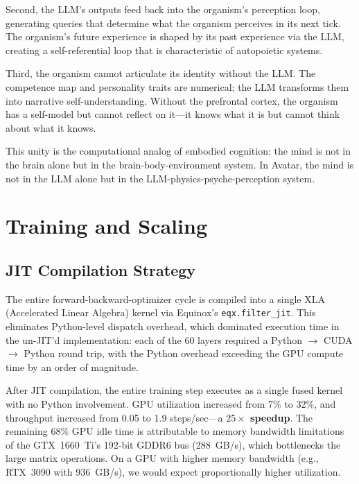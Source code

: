 \documentclass[11pt,a4paper,twocolumn]{article}
\begin{document}
Second, the LLM's outputs feed back into the organism's perception loop, generating queries that determine what the organism perceives in its next tick.
The organism's future experience is shaped by its past experience via the LLM, creating a self-referential loop that is characteristic of autopoietic systems.

Third, the organism cannot articulate its identity without the LLM.
The competence map and personality traits are numerical; the LLM transforms them into narrative self-understanding.
Without the prefrontal cortex, the organism has a self-model but cannot reflect on it---it knows what it is but cannot think about what it knows.

This unity is the computational analog of embodied cognition: the mind is not in the brain alone but in the brain-body-environment system.
In Avatar, the mind is not in the LLM alone but in the LLM-physics-psyche-perception system.

\section{Training and Scaling}

\subsection{JIT Compilation Strategy}

The entire forward-backward-optimizer cycle is compiled into a single XLA (Accelerated Linear Algebra) kernel via Equinox's \texttt{eqx.filter\_jit}.
This eliminates Python-level dispatch overhead, which dominated execution time in the un-JIT'd implementation: each of the 60 layers required a Python $\to$ CUDA $\to$ Python round trip, with the Python overhead exceeding the GPU compute time by an order of magnitude.

After JIT compilation, the entire training step executes as a single fused kernel with no Python involvement.
GPU utilization increased from 7\% to 32\%, and throughput increased from 0.05 to 1.9 steps/sec---a \textbf{$25\times$ speedup}.
The remaining 68\% GPU idle time is attributable to memory bandwidth limitations of the GTX~1660~Ti's 192-bit GDDR6 bus (288~GB/s), which bottlenecks the large matrix operations.
On a GPU with higher memory bandwidth (e.g., RTX~3090 with 936~GB/s), we would expect proportionally higher utilization.
\end{document}
